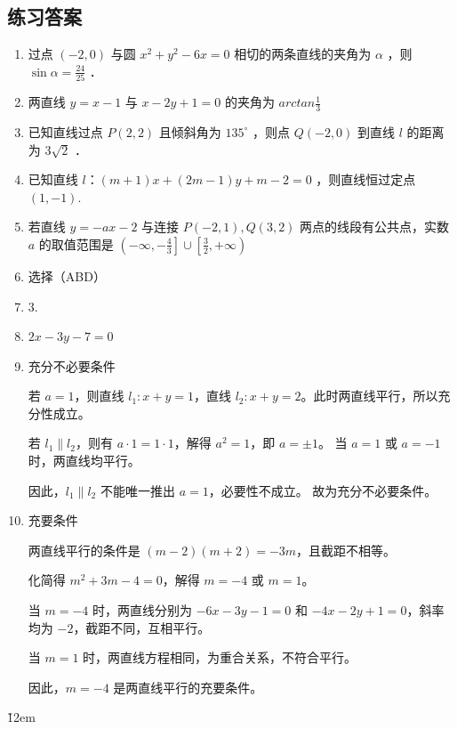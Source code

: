 \subsection{练习答案}
\begin{tips}
    \begin{enumerate}
        \item 过点 $(-2,0)$ 与圆 $x^2+y^2-6 x=0$ 相切的两条直线的夹角为 $\alpha$ ，则 $\sin \alpha= \frac{24}{25}$ ．
        \item 两直线 $y=x-1$ 与 $x-2 y+1=0$ 的夹角为 $arctan\frac{1}{3}$
        \item 已知直线过点 $P(2,2)$ 且倾斜角为 $135^{\circ}$ ，则点 $Q(-2,0)$ 到直线 $l$ 的距离为 $3\sqrt{2}$ ．
        \item 已知直线 $l$：$(m+1) x+(2 m-1) y+m-2=0$ ，则直线恒过定点 \underline{$(1,-1)$}.
        \item 若直线 $y=-a x-2$ 与连接 $P(-2,1), Q(3,2)$ 两点的线段有公共点，实数 $a$ 的取值范围是 $\left(-\infty,-\frac{4}{3}\right] \cup\left[\frac{3}{2},+\infty\right)$
        \item 选择（ABD）
        \item $3$.
        \item $2 x-3 y-7=0$
        \item 充分不必要条件

              若 $a=1$，则直线 $l_1: x+y=1$，直线 $l_2: x+y=2$。此时两直线平行，所以充分性成立。

              若 $l_1 \parallel l_2$，则有 $a \cdot 1 = 1 \cdot 1$，解得 $a^2=1$，即 $a = \pm 1$。  当 $a=1$ 或 $a=-1$ 时，两直线均平行。

              因此，$l_1 \parallel l_2$ 不能唯一推出 $a=1$，必要性不成立。
              故为充分不必要条件。
        \item 充要条件

              两直线平行的条件是 $(m-2)(m+2) = -3m$，且截距不相等。

              化简得 $m^2+3m-4=0$，解得 $m=-4$ 或 $m=1$。

              当 $m=-4$ 时，两直线分别为 $-6x-3y-1=0$ 和 $-4x-2y+1=0$，斜率均为 $-2$，截距不同，互相平行。

              当 $m=1$ 时，两直线方程相同，为重合关系，不符合平行。

              因此，$m=-4$ 是两直线平行的充要条件。
    \end{enumerate}
\end{tips}

\v{12em}
